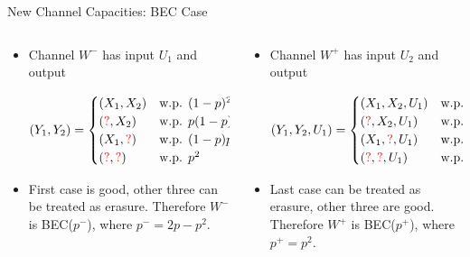 \documentclass[8pt, compress]{beamer}
\begin{document}
\begin{frame}{New Channel Capacities: BEC Case}
    \begin{columns}
        \begin{column}{0.45\linewidth}
            \begin{itemize}
                \item<1-> Channel $W^-$ has input $U_1$ and output
                \begin{flushleft}
                $$
                (Y_1, Y_2) = 
                \begin{cases}
                (X_1, X_2) &\text{w.p. }(1-p)^2 \\
                (\textcolor{red}{? }, X_2) &\text{w.p. }p(1-p) \\
                (X_1, \textcolor{red}{?}) &\text{w.p. }(1-p)p \\
                (\textcolor{red}{? }, \textcolor{red}{?}) &\text{w.p. }p^2 \\
                \end{cases}
                $$
                \end{flushleft}
                \item<2-> First case is good, other three can be treated as erasure. Therefore $W^-$ is BEC($p^-$), where $p^- = 2p-p^2$.\\
                
            \end{itemize}
        \end{column}
        \begin{column}{0.55\linewidth}
            \begin{itemize}
                \item<3-> Channel $W^+$ has input $U_2$ and output
                \begin{flushleft}
                $$
                (Y_1, Y_2, U_1) = 
                \begin{cases}
                (X_1, X_2, U_1) &\text{w.p. }(1-p)^2 \\
                (\textcolor{red}{? }, X_2, U_1) &\text{w.p. }p(1-p) \\
                (X_1, \textcolor{red}{?}, U_1) &\text{w.p. }(1-p)p \\
                (\textcolor{red}{? }, \textcolor{red}{?}, U_1) &\text{w.p. }p^2 \\
                \end{cases}
                $$
                \end{flushleft}
                \item<4-> Last case can be treated as erasure, other three are good. Therefore $W^+$ is BEC($p^+$), where $p^+ = p^2$.\\
                

\end{itemize}
\end{column}
\end{columns}
\end{frame}
\end{document}
